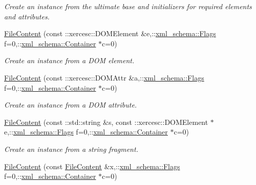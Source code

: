 \begin{DoxyCompactItemize}
\begin{DoxyCompactList}\small\item\em Create an instance from the ultimate base and initializers for required elements and attributes. \item\end{DoxyCompactList}\item 
\hyperlink{classopenstack_1_1xml_1_1FileContent_a6c17c8caf5d217e9f9498e0c13aa0916}{FileContent} (const ::xercesc::DOMElement \&e,::\hyperlink{namespacexml__schema_affb4c227cbd9aa7453dd1dc5a1401943}{xml\_\-schema::Flags} f=0,::\hyperlink{namespacexml__schema_a333dea2213742aea47a37532dec4ec27}{xml\_\-schema::Container} $\ast$c=0)
\begin{DoxyCompactList}\small\item\em Create an instance from a DOM element. \item\end{DoxyCompactList}\item 
\hyperlink{classopenstack_1_1xml_1_1FileContent_ad02d291e2fae1c8312cba68331c5366e}{FileContent} (const ::xercesc::DOMAttr \&a,::\hyperlink{namespacexml__schema_affb4c227cbd9aa7453dd1dc5a1401943}{xml\_\-schema::Flags} f=0,::\hyperlink{namespacexml__schema_a333dea2213742aea47a37532dec4ec27}{xml\_\-schema::Container} $\ast$c=0)
\begin{DoxyCompactList}\small\item\em Create an instance from a DOM attribute. \item\end{DoxyCompactList}\item 
\hyperlink{classopenstack_1_1xml_1_1FileContent_a589aed9d3d829d310e0d7399ca0487f1}{FileContent} (const ::std::string \&s, const ::xercesc::DOMElement $\ast$e,::\hyperlink{namespacexml__schema_affb4c227cbd9aa7453dd1dc5a1401943}{xml\_\-schema::Flags} f=0,::\hyperlink{namespacexml__schema_a333dea2213742aea47a37532dec4ec27}{xml\_\-schema::Container} $\ast$c=0)
\begin{DoxyCompactList}\small\item\em Create an instance from a string fragment. \item\end{DoxyCompactList}\item 
\hyperlink{classopenstack_1_1xml_1_1FileContent_a667bfd8e0df2dc82b733c390de43ee54}{FileContent} (const \hyperlink{classopenstack_1_1xml_1_1FileContent}{FileContent} \&x,::\hyperlink{namespacexml__schema_affb4c227cbd9aa7453dd1dc5a1401943}{xml\_\-schema::Flags} f=0,::\hyperlink{namespacexml__schema_a333dea2213742aea47a37532dec4ec27}{xml\_\-schema::Container} $\ast$c=0)

\end{DoxyCompactItemize}

